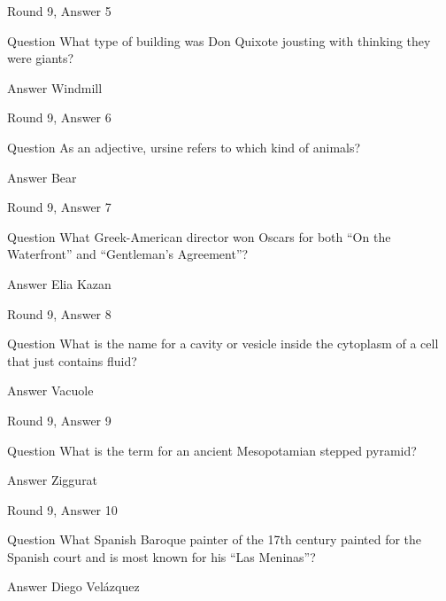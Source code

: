 \documentclass[11pt]{beamer}
\begin{document}
\begin{frame}{Round 9, Answer 5}
\begin{block}{Question}
What type of building was Don Quixote jousting with thinking they were giants\@?
\end{block}
\pause{}
\begin{block}{Answer}
Windmill
\end{block}
\end{frame}
    

\begin{frame}{Round 9, Answer 6}
\begin{block}{Question}
As an adjective, ursine refers to which kind of animals\@?
\end{block}
\pause{}
\begin{block}{Answer}
Bear
\end{block}
\end{frame}
    

\begin{frame}{Round 9, Answer 7}
\begin{block}{Question}
What Greek-American director won Oscars for both ``On the Waterfront'' and ``Gentleman's Agreement''\@?
\end{block}
\pause{}
\begin{block}{Answer}
Elia Kazan
\end{block}
\end{frame}
    

\begin{frame}{Round 9, Answer 8}
\begin{block}{Question}
What is the name for a cavity or vesicle inside the cytoplasm of a cell that just contains fluid\@?
\end{block}
\pause{}
\begin{block}{Answer}
Vacuole
\end{block}
\end{frame}
    

\begin{frame}{Round 9, Answer 9}
\begin{block}{Question}
What is the term for an ancient Mesopotamian stepped pyramid\@?
\end{block}
\pause{}
\begin{block}{Answer}
Ziggurat
\end{block}
\end{frame}
    

\begin{frame}{Round 9, Answer 10}
\begin{block}{Question}
What Spanish Baroque painter of the 17th century painted for the Spanish court and is most known for his ``Las Meninas''\@?
\end{block}
\pause{}
\begin{block}{Answer}
Diego Velázquez
\end{block}
\end{frame}
    
\end{document}
